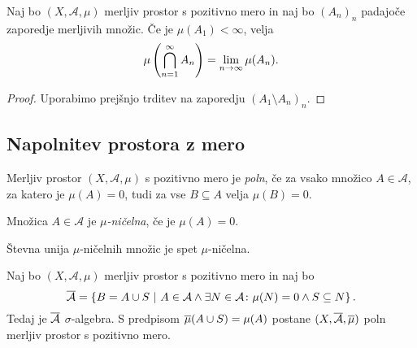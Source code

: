 
\begin{posledica}
Naj bo $(X, \mathcal{A}, \mu)$ merljiv prostor s pozitivno mero in
naj bo $(A_n)_n$ padajoče zaporedje merljivih množic. Če je
$\mu(A_1) < \infty$, velja
\[
\mu \left(\bigcap_{n=1}^\infty A_n\right) =
\lim_{n \to \infty} \mu(A_n).
\]
\end{posledica}

\begin{proof}
Uporabimo prejšnjo trditev na zaporedju $(A_1 \setminus A_n)_n$.
\end{proof}

\newpage

\subsection{Napolnitev prostora z mero}

\begin{definicija}
Merljiv prostor $(X, \mathcal{A}, \mu)$ s pozitivno mero je
\emph{poln}, če za vsako množico
$A \in \mathcal{A}$, za katero je $\mu(A) = 0$, tudi za vse
$B \subseteq A$ velja $\mu(B) = 0$.
\end{definicija}

\begin{definicija}
Množica $A \in \mathcal{A}$ je
\emph{$\mu$-ničelna}, če je
$\mu(A) = 0$.
\end{definicija}

\begin{opomba}
Števna unija $\mu$-ničelnih množic je spet $\mu$-ničelna.
\end{opomba}

\begin{izrek}
Naj bo $(X, \mathcal{A}, \mu)$ merljiv prostor s pozitivno mero in
naj bo
\[
\overline{\mathcal{A}} =
\left\{B = A \cup S~\middle\vert~A \in \mathcal{A} \land
\exists N \in \mathcal{A} \colon \mu(N) = 0 \land S \subseteq N\right\}.
\]
Tedaj je $\overline{\mathcal{A}}$ $\sigma$-algebra. S predpisom
$\overline{\mu}(A \cup S) = \mu(A)$ postane
$(X, \overline{\mathcal{A}}, \overline{\mu})$ poln merljiv prostor s
pozitivno mero.
\end{izrek}

